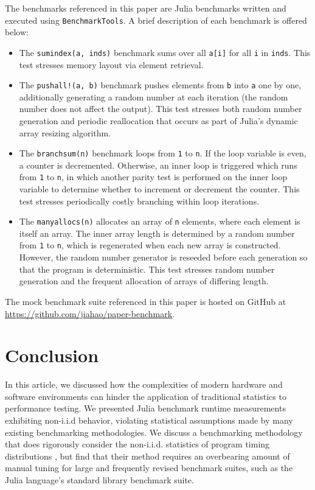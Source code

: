 \documentclass[conference]{IEEEtran}
\begin{document}
The benchmarks referenced in this paper are Julia benchmarks written and executed using
\lstinline|BenchmarkTools|. A brief description of each benchmark is offered below:

\begin{itemize}
    \item The \lstinline|sumindex(a, inds)| benchmark sums over all \lstinline|a[i]| for all
    \lstinline|i| in \lstinline|inds|. This test stresses memory layout via element
    retrieval.
    \item The \lstinline|pushall!(a, b)| benchmark pushes elements from \lstinline|b| into
    \lstinline|a| one by one, additionally generating a random number at each iteration (the
    random number does not affect the output). This test stresses both random number
    generation and periodic reallocation that occurs as part of Julia's dynamic array
    resizing algorithm.
    \item The \lstinline|branchsum(n)| benchmark loops from \lstinline|1| to \lstinline|n|.
    If the loop variable is even, a counter is decremented. Otherwise, an inner loop is
    triggered which runs from \lstinline|1| to \lstinline|n|, in which another parity test
    is performed on the inner loop variable to determine whether to increment or decrement
    the counter. This test stresses periodically costly branching within loop iterations.
    \item The \lstinline|manyallocs(n)| allocates an array of \lstinline|n| elements, where
    each element is itself an array. The inner array length is determined by a random number
    from \lstinline|1| to \lstinline|n|, which is regenerated when each new array is
    constructed. However, the random number generator is reseeded before each generation so
    that the program is deterministic. This test stresses random number generation and
    the frequent allocation of arrays of differing length.
\end{itemize}

The mock benchmark suite referenced in this paper is hosted on GitHub at
\url{https://github.com/jiahao/paper-benchmark}.

\section*{Conclusion}
\label{sec:conclusion}

In this article, we discussed how the complexities of modern hardware and software
environments can hinder the application of traditional statistics to performance testing. We
presented Julia benchmark runtime measurements exhibiting non-i.i.d behavior, violating
statistical assumptions made by many existing benchmarking methodologies. We discuss a
benchmarking methodology that does rigorously consider the non-i.i.d. statistics of program
timing distributions \cite{Kalibera2013}, but find that their method requires an overbearing
amount of manual tuning for large and frequently revised benchmark suites, such as the Julia
language's standard library benchmark suite.
\end{document}
